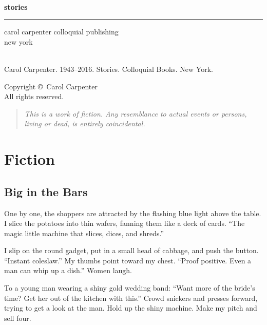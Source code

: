 \documentclass[twoside,10pt]{book}
\author{}
\date{}
\begin{document}
\pagestyle{empty}
\cleardoublepage
\mbox{ }
\cleardoublepage
\frontmatter
\begin{center}
  \vspace*{48pt}
  \hfill {\fontsize{86}{52}\sffamily\bfseries stories}
  \\[12pt]
  \hrule height 1pt
  \hfill {\fontsize{24}{52}\sffamily carol carpenter}
  \vfill
  \hfill {\sffamily colloquial publishing}
  \\
  \hfill {\sffamily new york}
\end{center}
\color{black} %


\clearpage
\pagecolor{white}
\mbox{}
\\[36pt]
Carol Carpenter. 1943--2016.  Stories.  Colloquial Books.  New
York. 
\\[12pt]
\begin{center}
Copyright \copyright\, Carol Carpenter
\\[4pt]
All rights reserved.
\end{center}
\vfill
\begin{quote}
\emph{This is a work of fiction. Any resemblance to actual events or
persons, living or dead, is entirely coincidental.}
\end{quote}
\vfill
\vfill
\null

\cleardoublepage
\pagestyle{fancy}
\tableofcontents


\mainmatter
\cleardoublepage
\part{Fiction}
\thispagestyle{empty}

\cleardoublepage
\chapter{Big in the Bars}

One by one, the shoppers are attracted by the flashing blue light above
the table. I slice the potatoes into thin wafers, fanning them like a
deck of cards. ``The magic little machine that slices, dices, and
shreds.''

I slip on the round gadget, put in a small head of cabbage, and push the
button. ``Instant coleslaw.'' My thumbs point toward my chest. ``Proof
positive. Even a man can whip up a dish.'' Women laugh.

To a young man wearing a shiny gold wedding band: ``Want more of the
bride's time? Get her out of the kitchen with this.'' Crowd snickers and
presses forward, trying to get a look at the man. Hold up the shiny
machine. Make my pitch and sell four.
\end{document}
